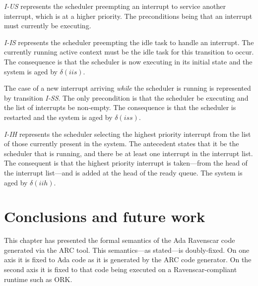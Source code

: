 \emph{I-US} represents the scheduler preempting an interrupt to
service another interrupt, which is at a higher priority. The
preconditions being that an interrupt must currently be executing.

\emph{I-IS} represents the scheduler preempting the idle task to
handle an interrupt. The currently running active context must be the
idle task for this transition to occur. The consequence is that the
scheduler is now executing in its initial state and the system is aged
by $\delta(iis)$.


The case of a new interrupt arriving \emph{while} the scheduler is
running is represented by transition \emph{I-SS}. The only
precondition is that the scheduler be executing and the list of
interrupts be non-empty. The consequence is that the scheduler is
restarted and the system is aged by $\delta(iss)$.


\emph{I-IH} represents the scheduler selecting the highest priority
interrupt from the list of those currently present in the system. The
antecedent states that it be the scheduler that is running, and there
be at least one interrupt in the interrupt list. The consequent is
that the highest priority interrupt is taken---from the head of the
interrupt list---and is added at the head of the ready queue. The
system is aged by $\delta(iih)$.


\section{Conclusions and future work}
This chapter has presented the formal semantics of the Ada Ravenscar
code generated via the ARC tool. This semantics---as stated---is
doubly-fixed. On one axis it is fixed to Ada code as it is generated
by the ARC code generator. On the second axis it is fixed to that code
being executed on a Ravenscar-compliant runtime such as ORK.

